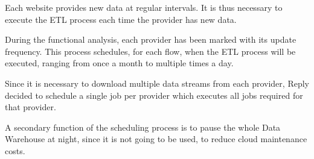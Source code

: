 Each website provides new data at regular intervals.
It is thus necessary to execute the ETL process each time the provider has new data.

During the functional analysis, each provider has been marked with its update frequency.
This process schedules, for each flow, when the ETL process will be executed, ranging from once a month to multiple times a day.

Since it is necessary to download multiple data streams from each provider, Reply decided to schedule a single job per provider which executes all jobs required for that provider.

A secondary function of the scheduling process is to pause the whole Data Warehouse at night, since it is not going to be used, to reduce cloud maintenance costs.
